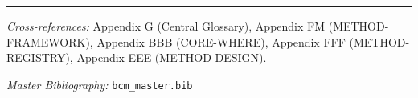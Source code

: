\nocite{bcm_master}



\vspace{1em}
\hrule
\vspace{0.5em}

\noindent\textit{Cross-references:}
Appendix G (Central Glossary),
Appendix FM (METHOD-FRAMEWORK),
Appendix BBB (CORE-WHERE),
Appendix FFF (METHOD-REGISTRY),
Appendix EEE (METHOD-DESIGN).

\noindent\textit{Master Bibliography:} \texttt{bcm\_master.bib}


